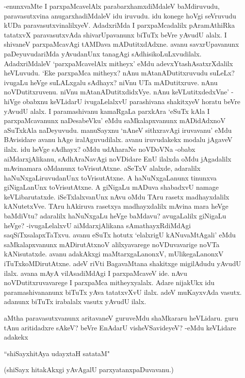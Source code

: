 -enunxvaMte I parxpaMcavelAlx parabarxhamxdiMdaleV baMdiruvudu, paravasutxvina anugarxhadiMdaleV idu iruvudu. idu konege hoVgi seVruvudu kUDa paravasutxvinalilxyeV. AdadxriMda I parxpaMcadalilx pAramAthiRka tatatxvX paravasutxvAda shivarUpavanunx biTuTx beVre yAvudU alalx. I shivaneV parxpaMcavAgi tAMDava mADutitxdAdxne. avanu savxrUpavanunx paDeyuvudariMda yAvudanUnx tanagAgi sAdhisikoLuLxvudilalx. AdadxriMdaleV `parxpaMcavelAlx mitheyx' eMdu adevxYtashAsatxrXdalilx heVLuvudu. `Eke parxpaMca mitheyx? nAnu mAtanADutitxruvudu suLeLx? ivugaLu heVge suLALxgalu sAdhayx? niVnu UTa mADutitxruve. nAnu noVDutitxruvenu. niVnu mAtanADutitxdidxVye. nAnu keVLutitxdedxVne' -hiVge obabxnu keVLidarU ivugaLelalxvU parashivana shakitxyeV horatu beVre yAvudU alalx. I paramashivanu kamaRgaLa parxkAra `eSuTx kAla I parxpaMcavanunx naDesabeVku' eMdu saMkalapxvanunx mADidAdxnoV aSuTxkAla naDeyuvudu. manuSayxnu `nAneV sithxravAgi iruvavanu' eMdu BAvisidare avanu hAge iralAguvudilalx. avanu iruvudakekx modalu jAgaveV ilalx. idu heVge sAdhayx? oMdu udAharaNe noVDoVNa -obabx aiMdarxjAlikanu, sAdhAraNavAgi noVDidare EnU ilalxda oMdu jAgadalilx mAvinamara oMdanunx toVrisutAtxne. aSeTxV alalxde, adaralilx haNuNxgaLiruvudanUnx toVrisutAtxne. A haNuNxgaLanunx tinunxva giNigaLanUnx toVrisutAtxne. A giNigaLu mADuva shabadxvU namage keVLibarutatxde. iSeTxlalxvanUnx nAvu oMdu TAru rasetx madhayxdalilx kANutetxVve. TAru hAkiruva rasetxya madhayxdalilx mAvina mara heVge baMdiVtu? adaralilx haNuNxgaLu heVge baMdavu? avugaLalilx giNigaLu heVge? -ivugaLelalxvU aiMdarxjAlikana sAmathayxRdiMdAgi saqSiTxsalapxTaTxvu. avanu eSuTx hotutx `elalxrigU kANuvaMtAgali' eMdu saMkalapxvanunx mADirutAtxnoV alilxyavarege noVDuvavarige noVTa kANisutatxde. avanu adakAkxgi maMtarxgaLanonxV, mUlikegaLanonxV iTuTxkoMDirutAtxne. adeV riVti BagavaMtana shakitxge migilAdudu yAvudU ilalx. avana mAyA vilAsadiMdAgi I parxpaMcaveV ide. nAvu noVDutitxruvavarege I parxpaMca mitheyxyalalx. Adare nijakUkx idu paramashivananunx biTuTx yAva tatatxvXvU ilalx. adeV muKayxvAda vasutx. adanunx biTuTx irabalalx vasutx yAvudU ilalx. 

aMtha paravasutxvanunx aritavaneV guruveMdu shaMkararu heVLidaru. guru tAnu aritidadxre sAkeV? beVre EnAdarU visheVSavideyeV? -eMdu keVLidare adakekx 

\begin{shloka}
``shiSayxhitAya udayxtaH satataM"
\end{shloka}

(shiSayx hitakAkxgi yAvAgalU parxyatanxpaDuvavanu.)

